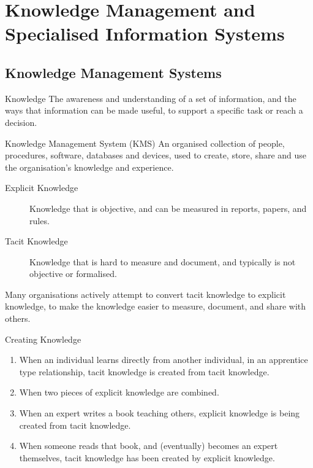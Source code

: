 \documentclass[\main/notes.tex]{subfiles}
\begin{document}
	\setcounter{chapter}{8}
	\chapter{Knowledge Management and Specialised Information Systems}
		\section{Knowledge Management Systems}
			\begin{definition}{Knowledge}
				The awareness and understanding of a set of information, and the ways that information can be made useful, to support a specific task or reach a decision.
			\end{definition}
			\begin{definition}{Knowledge Management System (KMS)}
				An organised collection of people, procedures, software, databases and devices, used to create, store, share and use the organisation's knowledge and experience.
				\begin{indentparagraph}
					\begin{description}
						\item[Explicit Knowledge] Knowledge that is objective, and can be measured in reports, papers, and rules.
						\item[Tacit Knowledge] Knowledge that is hard to measure and document, and typically is not objective or formalised.
					\end{description}
					Many organisations actively attempt to convert tacit knowledge to explicit knowledge, to make the knowledge easier to measure, document, and share with others.
				\end{indentparagraph}
			\end{definition}
			\begin{sidenote}{Creating Knowledge}
				\begin{enumerate}
					\item When an individual learns directly from another individual, in an apprentice type relationship, tacit knowledge is created from tacit knowledge.
					\item When two pieces of explicit knowledge are combined.
					\item When an expert writes a book teaching others, explicit knowledge is being created from tacit knowledge.
					\item When someone reads that book, and (eventually) becomes an expert themselves, tacit knowledge has been created by explicit knowledge.
				\end{enumerate}
			\end{sidenote}
\end{document}
